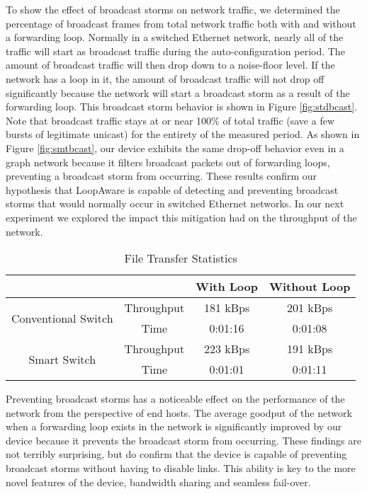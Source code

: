     To show the effect of broadcast storms on network traffic, we determined the percentage of broadcast frames from total network traffic both with and without a forwarding loop.
    Normally in a switched Ethernet network, nearly all of the traffic will start as broadcast traffic during the auto-configuration period.
    The amount of broadcast traffic will then drop down to a noise-floor level.
    If the network has a loop in it, the amount of broadcast traffic will not drop off significantly because the network will start a broadcast storm as a result of the forwarding loop.
    This broadcast storm behavior is shown in Figure \ref{fig:stdbcast}.
    Note that broadcast traffic stays at or near 100\% of total traffic (save a few bursts of legitimate unicast) for the entirety of the measured period. 
    As shown in Figure \ref{fig:smtbcast}, our device exhibits the same drop-off behavior even in a graph network because it filters broadcast packets out of forwarding loops, preventing a broadcast storm from occurring.
    These results confirm our hypothesis that LoopAware is capable of detecting and preventing broadcast storms that would normally occur in switched Ethernet networks.
    In our next experiment we explored the impact this mitigation had on the throughput of the network.

    \begin{table}[ht]
	    \centering
	    \caption{File Transfer Statistics}
	    \label{tab:throughput}
	    \begin{tabular}{|c|c|c|c|}
		    \hline
		    \multicolumn{2}{|c|}{} & With Loop	& Without Loop \\
		    \hline
		    \multirow{2}{*}{Conventional Switch}& Throughput	& 181 kBps	& 201 kBps \\ \cline{2-4}
		    & Time	& 0:01:16	& 0:01:08 \\
		    \hline
		    \multirow{2}{*}{Smart Switch}	& Throughput	& 223 kBps	& 191 kBps \\ \cline{2-4}
		    & Time	& 0:01:01	& 0:01:11\\
		    \hline
	    \end{tabular}
    \end{table}

    Preventing broadcast storms has a noticeable effect on the performance of the network from the perspective of end hosts.
    The average goodput of the network when a forwarding loop exists in the network is significantly improved by our device because it prevents the broadcast storm from occurring.
    These findings are not terribly surprising, but do confirm that the device is capable of preventing broadcast storms without having to disable links.
    This ability is key to the more novel features of the device, bandwidth sharing and seamless fail-over.

